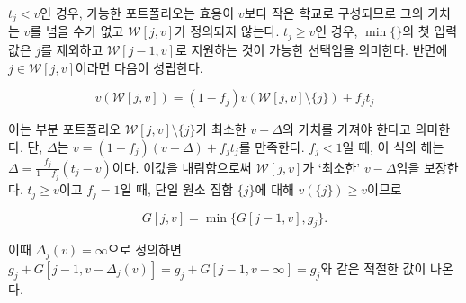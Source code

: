 \documentclass[11pt]{article} %
\newif\ifen
\theoremstyle{definition}
\theoremstyle{definition}
\begin{document}
\ifen
In the $t_j < v$ case, any feasible portfolio must be composed of schools with utility less than $v$, and therefore its valuation can not equal $v$, meaning that $\mathcal{W}[j, v]$ is undefined. In the $t_j \geq v$ case, the first argument to $\min\{\}$ says simply that omitting $j$ and choosing $\mathcal{W}[j-1, v]$ is a permissible choice for $\mathcal{W}[j, v]$. If, on the other hand, $j \in \mathcal{W}[j, v]$, then
\else
$t_j < v$인 경우, 가능한 포트폴리오는 효용이 $v$보다 작은 학교로 구성되므로 그의 가치는 $v$를 넘을 수가 없고 $\mathcal{W}[j, v]$가 정의되지 않는다. $t_j \geq v$인 경우, $\min\{\}$의 첫 입력값은 $j$를 제외하고 $\mathcal{W}[j-1, v]$로 지원하는 것이 가능한 선택임을 의미한다. 반면에 $j \in \mathcal{W}[j, v]$이라면 다음이 성립한다.
\fi
\begin{equation} \label{solvemeforvwjvminusj}
v(\mathcal{W}[j, v]) = (1 - f_j )v(\mathcal{W}[j, v]\setminus \{j\}) + f_j t_j\ifen.\fi\end{equation}
\ifen
Therefore, the subportfolio $\mathcal{W}[j, v]\setminus \{j\}$ must have a valuation of at least $v - \Delta$, where $\Delta$ satisfies $v = (1 - f_j )(v - \Delta) + f_j t_j $. When $f_j < 1$, the solution to this equation is $ \Delta = \frac{f_j}{1 - f_j} (t_j - v)$. By rounding this value down, we ensure that the true valuation of $\mathcal{W}[j, v]$ is \emph{at least} $v - \Delta$. When $t_j \geq v$ and $f_j = 1$, the singleton $\{j\}$ has $v(\{j\}) \geq v$, so
\else
이는 부분 포트폴리오 $\mathcal{W}[j, v]\setminus \{j\}$가 최소한 $v - \Delta$의 가치를 가져야 한다고 의미한다. 단,  $\Delta$는 $v = (1 - f_j )(v - \Delta) + f_j t_j $를 만족한다. $f_j < 1$일 때, 이 식의 해는 $ \Delta = \frac{f_j}{1 - f_j} (t_j - v)$이다. 이값을 내림함으로써 $\mathcal{W}[j, v]$가 `최소한' $v - \Delta$임을 보장한다. $t_j \geq v$이고 $f_j = 1$일 때, 단일 원소 집합 $\{j\}$에 대해 $v(\{j\}) \geq v$이므로
\fi
\begin{equation}G[j, v] = \min\bigl\{G[j-1, v], g_j \bigr\}.\end{equation}
\ifen
Defining $\Delta_j(v) = \infty$ in this case ensures that $g_j + G[j-1, v-\Delta_j(v)] = g_j+ G[j-1, v-\infty] = g_j $ as required.
\else
이때 $\Delta_j(v) = \infty$으로 정의하면 $g_j + G[j-1, v-\Delta_j(v)] = g_j+ G[j-1, v-\infty] = g_j $와 같은 적절한 값이 나온다.
\fi
%
\end{document}
